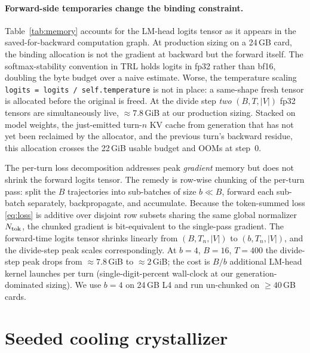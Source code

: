 \documentclass[11pt,a4paper]{article}
\begin{document}
\paragraph{Forward-side temporaries change the binding constraint.}
Table~\ref{tab:memory} accounts for the LM-head logits tensor as it appears in the saved-for-backward computation graph. At production sizing on a 24\,GB card, the binding allocation is not the gradient at backward but the forward itself. The softmax-stability convention in TRL holds logits in fp32 rather than bf16, doubling the byte budget over a naive estimate. Worse, the temperature scaling \texttt{logits = logits / self.temperature} is not in place: a same-shape fresh tensor is allocated before the original is freed. At the divide step \emph{two} $(B, T, |V|)$ fp32 tensors are simultaneously live, $\approx 7.8$\,GiB at our production sizing. Stacked on model weights, the just-emitted turn-$n$ KV cache from generation that has not yet been reclaimed by the allocator, and the previous turn's backward residue, this allocation crosses the 22\,GiB usable budget and OOMs at step~0.

The per-turn loss decomposition addresses peak \emph{gradient} memory but does not shrink the forward logits tensor. The remedy is row-wise chunking of the per-turn pass: split the $B$ trajectories into sub-batches of size $b\!\ll\!B$, forward each sub-batch separately, backpropagate, and accumulate. Because the token-summed loss \eqref{eq:loss} is additive over disjoint row subsets sharing the same global normalizer $N_{\rm tok}$, the chunked gradient is bit-equivalent to the single-pass gradient. The forward-time logits tensor shrinks linearly from $(B, T_n, |V|)$ to $(b, T_n, |V|)$, and the divide-step peak scales correspondingly. At $b=4$, $B=16$, $T=400$ the divide-step peak drops from $\approx 7.8$\,GiB to $\approx 2$\,GiB; the cost is $B/b$ additional LM-head kernel launches per turn (single-digit-percent wall-clock at our generation-dominated sizing). We use $b=4$ on 24\,GB L4 and run un-chunked on $\geq 40$\,GB cards.

\section{Seeded cooling crystallizer}
\label{app:crystallizer}
\end{document}
